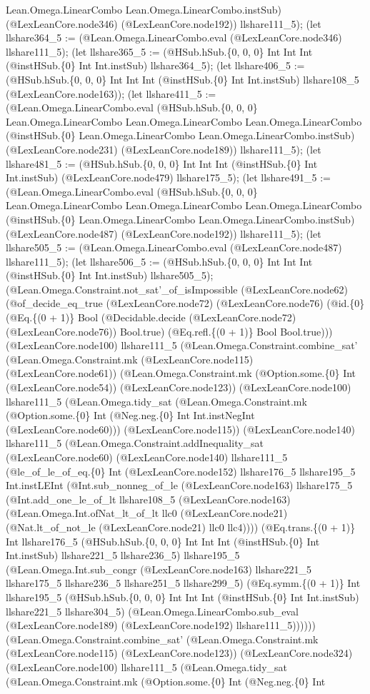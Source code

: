 \documentclass[11pt]{article}
\begin{document}
Lean.Omega.LinearCombo Lean.Omega.LinearCombo.instSub) (@LexLeanCore.node346) (@LexLeanCore.node192)) llshare111\_5); (let llshare364\_5 := (@Lean.Omega.LinearCombo.eval (@LexLeanCore.node346) llshare111\_5); (let llshare365\_5 := (@HSub.hSub.\{0, 0, 0\} Int Int Int (@instHSub.\{0\} Int Int.instSub) llshare364\_5); (let llshare406\_5 := (@HSub.hSub.\{0, 0, 0\} Int Int Int (@instHSub.\{0\} Int Int.instSub) llshare108\_5 (@LexLeanCore.node163)); (let llshare411\_5 := (@Lean.Omega.LinearCombo.eval (@HSub.hSub.\{0, 0, 0\} Lean.Omega.LinearCombo Lean.Omega.LinearCombo Lean.Omega.LinearCombo (@instHSub.\{0\} Lean.Omega.LinearCombo Lean.Omega.LinearCombo.instSub) (@LexLeanCore.node231) (@LexLeanCore.node189)) llshare111\_5); (let llshare481\_5 := (@HSub.hSub.\{0, 0, 0\} Int Int Int (@instHSub.\{0\} Int Int.instSub) (@LexLeanCore.node479) llshare175\_5); (let llshare491\_5 := (@Lean.Omega.LinearCombo.eval (@HSub.hSub.\{0, 0, 0\} Lean.Omega.LinearCombo Lean.Omega.LinearCombo Lean.Omega.LinearCombo (@instHSub.\{0\} Lean.Omega.LinearCombo Lean.Omega.LinearCombo.instSub) (@LexLeanCore.node487) (@LexLeanCore.node192)) llshare111\_5); (let llshare505\_5 := (@Lean.Omega.LinearCombo.eval (@LexLeanCore.node487) llshare111\_5); (let llshare506\_5 := (@HSub.hSub.\{0, 0, 0\} Int Int Int (@instHSub.\{0\} Int Int.instSub) llshare505\_5); (@Lean.Omega.Constraint.not\_sat'\_of\_isImpossible (@LexLeanCore.node62) (@of\_decide\_eq\_true (@LexLeanCore.node72) (@LexLeanCore.node76) (@id.\{0\} (@Eq.\{(0 + 1)\} Bool (@Decidable.decide (@LexLeanCore.node72) (@LexLeanCore.node76)) Bool.true) (@Eq.refl.\{(0 + 1)\} Bool Bool.true))) (@LexLeanCore.node100) llshare111\_5 (@Lean.Omega.Constraint.combine\_sat' (@Lean.Omega.Constraint.mk (@LexLeanCore.node115) (@LexLeanCore.node61)) (@Lean.Omega.Constraint.mk (@Option.some.\{0\} Int (@LexLeanCore.node54)) (@LexLeanCore.node123)) (@LexLeanCore.node100) llshare111\_5 (@Lean.Omega.tidy\_sat (@Lean.Omega.Constraint.mk (@Option.some.\{0\} Int (@Neg.neg.\{0\} Int Int.instNegInt (@LexLeanCore.node60))) (@LexLeanCore.node115)) (@LexLeanCore.node140) llshare111\_5 (@Lean.Omega.Constraint.addInequality\_sat (@LexLeanCore.node60) (@LexLeanCore.node140) llshare111\_5 (@le\_of\_le\_of\_eq.\{0\} Int (@LexLeanCore.node152) llshare176\_5 llshare195\_5 Int.instLEInt (@Int.sub\_nonneg\_of\_le (@LexLeanCore.node163) llshare175\_5 (@Int.add\_one\_le\_of\_lt llshare108\_5 (@LexLeanCore.node163) (@Lean.Omega.Int.ofNat\_lt\_of\_lt llc0 (@LexLeanCore.node21) (@Nat.lt\_of\_not\_le (@LexLeanCore.node21) llc0 llc4)))) (@Eq.trans.\{(0 + 1)\} Int llshare176\_5 (@HSub.hSub.\{0, 0, 0\} Int Int Int (@instHSub.\{0\} Int Int.instSub) llshare221\_5 llshare236\_5) llshare195\_5 (@Lean.Omega.Int.sub\_congr (@LexLeanCore.node163) llshare221\_5 llshare175\_5 llshare236\_5 llshare251\_5 llshare299\_5) (@Eq.symm.\{(0 + 1)\} Int llshare195\_5 (@HSub.hSub.\{0, 0, 0\} Int Int Int (@instHSub.\{0\} Int Int.instSub) llshare221\_5 llshare304\_5) (@Lean.Omega.LinearCombo.sub\_eval (@LexLeanCore.node189) (@LexLeanCore.node192) llshare111\_5)))))) (@Lean.Omega.Constraint.combine\_sat' (@Lean.Omega.Constraint.mk (@LexLeanCore.node115) (@LexLeanCore.node123)) (@LexLeanCore.node324) (@LexLeanCore.node100) llshare111\_5 (@Lean.Omega.tidy\_sat (@Lean.Omega.Constraint.mk (@Option.some.\{0\} Int (@Neg.neg.\{0\} Int 
\end{document}
